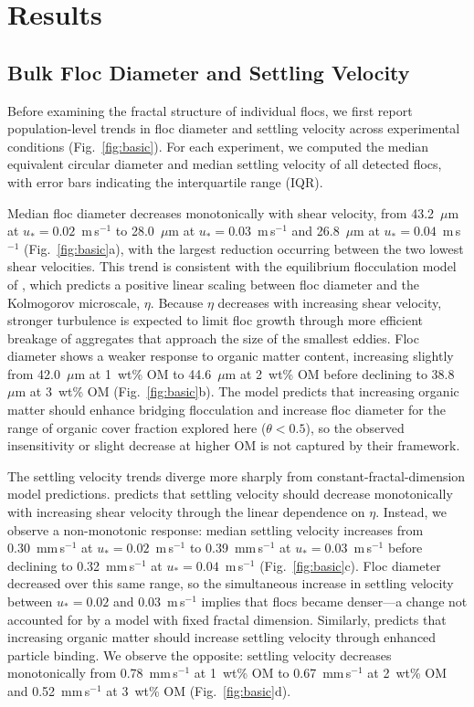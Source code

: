 \section{Results}

\subsection{Bulk Floc Diameter and Settling Velocity}

Before examining the fractal structure of individual flocs, we first report population-level trends in floc diameter and settling velocity across experimental conditions (Fig.~\ref{fig:basic}). For each experiment, we computed the median equivalent circular diameter and median settling velocity of all detected flocs, with error bars indicating the interquartile range (IQR).

Median floc diameter decreases monotonically with shear velocity, from 43.2~$\mu$m at $u_* = 0.02$~m\,s$^{-1}$ to 28.0~$\mu$m at $u_* = 0.03$~m\,s$^{-1}$ and 26.8~$\mu$m at $u_* = 0.04$~m\,s$^{-1}$ (Fig.~\ref{fig:basic}a), with the largest reduction occurring between the two lowest shear velocities. This trend is consistent with the equilibrium flocculation model of , which predicts a positive linear scaling between floc diameter and the Kolmogorov microscale, $\eta$. Because $\eta$ decreases with increasing shear velocity, stronger turbulence is expected to limit floc growth through more efficient breakage of aggregates that approach the size of the smallest eddies. Floc diameter shows a weaker response to organic matter content, increasing slightly from 42.0~$\mu$m at 1~wt\% OM to 44.6~$\mu$m at 2~wt\% OM before declining to 38.8~$\mu$m at 3~wt\% OM (Fig.~\ref{fig:basic}b). The  model predicts that increasing organic matter should enhance bridging flocculation and increase floc diameter for the range of organic cover fraction explored here ($\theta < 0.5$), so the observed insensitivity or slight decrease at higher OM is not captured by their framework.

The settling velocity trends diverge more sharply from constant-fractal-dimension model predictions.  predicts that settling velocity should decrease monotonically with increasing shear velocity through the linear dependence on $\eta$. Instead, we observe a non-monotonic response: median settling velocity increases from 0.30~mm\,s$^{-1}$ at $u_* = 0.02$~m\,s$^{-1}$ to 0.39~mm\,s$^{-1}$ at $u_* = 0.03$~m\,s$^{-1}$ before declining to 0.32~mm\,s$^{-1}$ at $u_* = 0.04$~m\,s$^{-1}$ (Fig.~\ref{fig:basic}c). Floc diameter decreased over this same range, so the simultaneous increase in settling velocity between $u_* = 0.02$ and 0.03~m\,s$^{-1}$ implies that flocs became denser---a change not accounted for by a model with fixed fractal dimension. Similarly,  predicts that increasing organic matter should increase settling velocity through enhanced particle binding. We observe the opposite: settling velocity decreases monotonically from 0.78~mm\,s$^{-1}$ at 1~wt\% OM to 0.67~mm\,s$^{-1}$ at 2~wt\% OM and 0.52~mm\,s$^{-1}$ at 3~wt\% OM (Fig.~\ref{fig:basic}d).

